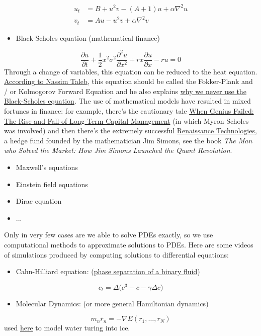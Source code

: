 \documentclass[12pt,a4paper]{article}
\begin{document}
\begin{align*}
u_t &= B + u^2 v - (A+1) u + \alpha \nabla^2 u \\ 
v_t &= Au  - u^2 v + \alpha \nabla^2 v
\end{align*}
\begin{itemize}
\item Black-Scholes equation (mathematical finance)

\end{itemize}
\[
\frac{\partial u}{\partial t} + \frac{1}{2}x^2\sigma^2 \frac{\partial^2 u}{\partial x^2} + rx \frac{\partial u}{\partial x} - ru = 0
\]
Through a change of variables, this equation can be reduced to the heat equation. \href{https://twitter.com/nntaleb/status/1596178404675551239}{According to Nassim Taleb}, this equation should be called the Fokker-Plank and / or Kolmogorov Forward Equation and he also explains \href{https://www.youtube.com/watch?v=UoGlUZPNouM}{why we never use the Black-Scholes equation}.   The use of mathematical models have resulted in mixed fortunes in finance: for example, there's the cautionary tale \href{https://en.wikipedia.org/wiki/When_Genius_Failed}{When Genius Failed: The Rise and Fall of Long-Term Capital Management} (in which Myron Scholes was involved) and then there's the extremely successful \href{https://en.wikipedia.org/wiki/Renaissance_Technologies}{Renaissance Technologies}, a hedge fund founded by the mathematician Jim Simons, see the book \emph{The Man who Solved the Market: How Jim Simons Launched the Quant Revolution}. 

\begin{itemize}
\item Maxwell's equations 


\item Einstein field equations


\item Dirac equation


\item ...

\end{itemize}
Only in very few cases are we able to solve PDEs exactly, so we use computational methods to approximate solutions to PDEs. Here are some videos of simulations produced by computing solutions to differential equations:

\begin{itemize}
\item Cahn-Hilliard equation: (\href{https://www.youtube.com/watch?v=MovUu2DwWvI}{phase separation of a binary fluid})

\end{itemize}
\[
c_t = \Delta \big( c^3 - c - \gamma \Delta c \big)
\]
\begin{itemize}
\item Molecular Dynamics: (or more general Hamiltonian dynamics)

\end{itemize}
\[
m_n \ddot{r_n} = - \nabla E(r_1, \dots, r_N)
\]
used \href{https://www.youtube.com/watch?v=zRUFzJrDtq0}{here} to model water turing into ice.
\end{document}
